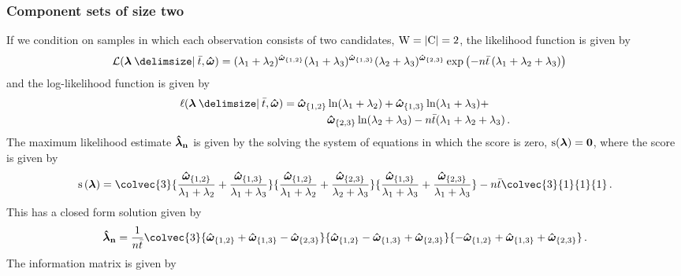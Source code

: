 \documentclass[
    11pt,
    extrafontsizes,
    article,
    oldfontcommands,
    final,
    oneside,
    openany,
    hidelinks]{memoir}
\begin{document}
\subsubsection{Component sets of size two}
If we condition on samples in which each observation consists of two 
candidates, $\mathrm{W} = \lvert\mathrm{C}\rvert = 2$, the likelihood function is 
given by
\begin{equation}
\begin{split}
    \likelihood(\vec\lambda \Given \bar{t}, \cntsymb) &= (\lambda_1 + \lambda_2)^{\cnt{1,2}} (\lambda_1 + \lambda_3)^{\cnt{1,3}} (\lambda_2 + \lambda_3)^{\cnt{2,3}} \exp\left(-n \bar{t} \left(\lambda_1 + \lambda_2 + \lambda_3\right)\right)
\end{split}
\end{equation}
and the log-likelihood function is given by
\begin{equation}
\begin{split}
    \ell(\vec\lambda \Given \bar{t}, \cntsymb) &= \cnt{1,2} \ln(\lambda_1 + \lambda_2) + \cnt{1,3} \ln(\lambda_1 + \lambda_3) + \\
        & \qquad \qquad \cnt{2,3} \ln(\lambda_2 + \lambda_3) - n \bar{t} (\lambda_1 + \lambda_2 + \lambda_3)\,.
\end{split}
\end{equation}
The maximum likelihood estimate $\boldsymbol{\mathbf{\hat{\boldsymbol{\mathbf{\lambda}}}_n}}$ is given by the solving the system of equations in which the score is zero, $\operatorname{\rm{s}}(\boldsymbol{\mathbf{\lambda}}) = \boldsymbol{\mathbf{0}}$, where the score is given by
\begin{equation}
\label{eq:score_expo}
    \score\left(\vec\lambda\right) = \colvec{3}
        {\frac{\cnt{1,2}}{\lambda_1 + \lambda_2} +  \frac{\cnt{1,3}}{\lambda_1 + \lambda_3}}
        {\frac{\cnt{1,2}}{\lambda_1 + \lambda_2} +  \frac{\cnt{2,3}}{\lambda_2 + \lambda_3}}
        {\frac{\cnt{1,3}}{\lambda_1 + \lambda_3} +  \frac{\cnt{2,3}}{\lambda_1 + \lambda_3}} -
        n \bar{t} \colvec{3}{1}{1}{1}\,.
\end{equation}
This has a closed form solution given by
\begin{equation}
    \expomle = \frac{1}{n \bar{t}} \colvec{3}
        {\cnt{1,2} + \cnt{1,3} - \cnt{2,3}}
        {\cnt{1,2} - \cnt{1,3} + \cnt{2,3}}
        {-\cnt{1,2} + \cnt{1,3} + \cnt{2,3}}\,.
\end{equation}
The information matrix is given by
\end{document}
